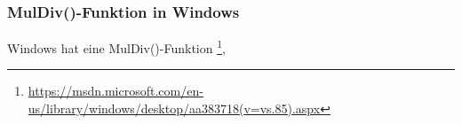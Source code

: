 \subsubsection{MulDiv()-Funktion in Windows}

Windows hat eine MulDiv()-Funktion
\footnote{\url{https://msdn.microsoft.com/en-us/library/windows/desktop/aa383718(v=vs.85).aspx}},

